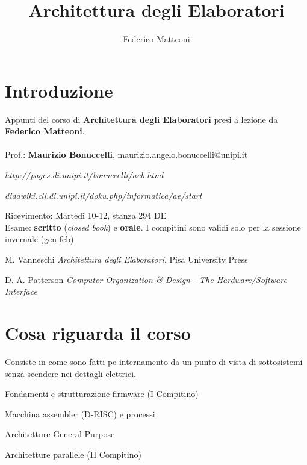 \documentclass[10pt]{article}
\begin{document}
\title{Architettura degli Elaboratori}
\author{Federico Matteoni}
\date{ }
\renewcommand*\contentsname{Indice}

\maketitle
\tableofcontents
\pagebreak
\section{Introduzione}
Appunti del corso di \textbf{Architettura degli Elaboratori} presi a lezione da \textbf{Federico Matteoni}.\\\\
Prof.: \textbf{Maurizio Bonuccelli}, maurizio.angelo.bonuccelli@unipi.it\\
\begin{list}{-}{Riferimenti web:}
\item \emph{http://pages.di.unipi.it/bonuccelli/aeb.html}
\item \emph{didawiki.cli.di.unipi.it/doku.php/informatica/ae/start}
\end{list}
Ricevimento: Martedì 10-12, stanza 294 DE\\
Esame: \textbf{scritto} (\textit{closed book}) e \textbf{orale}. I compitini sono validi solo per la sessione invernale (gen-feb)\\
\begin{list}{-}{Libri}
\item  M. Vanneschi \textit{Architettura degli Elaboratori}, Pisa University Press
\item D. A. Patterson \textit{Computer Organization \& Design - The Hardware/Software Interface}
\end{list}
\section{Cosa riguarda il corso}
Consiste in come sono fatti pc internamento da un punto di vista di sottosistemi senza scendere nei dettagli elettrici.
\begin{list}{-}{Il corso è diviso in quattro parti:}
\item Fondamenti e strutturazione firmware (I Compitino)
\item Macchina assembler (D-RISC) e processi
\item Architetture General-Purpose
\item Architetture parallele (II Compitino)
\end{list}
\end{document}
